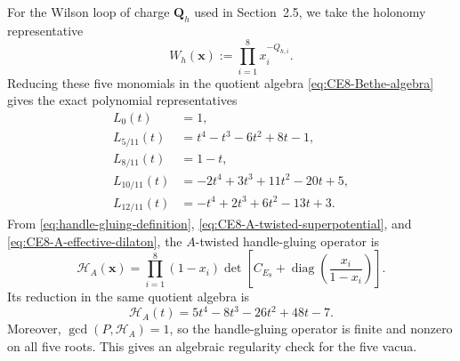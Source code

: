 \documentclass[11pt,a4paper]{article}
\numberwithin{equation}{section}
\begin{document}
For the Wilson loop of charge $\boldsymbol Q_h$ used in Section~2.5, we take the holonomy representative
\begin{equation}
  W_h(\boldsymbol x)
  :=\prod_{i=1}^{8}x_i^{-Q_{h,i}}.
  \label{eq:CE8-Wilson-holonomy}
\end{equation}
Reducing these five monomials in the quotient algebra \eqref{eq:CE8-Bethe-algebra} gives the exact polynomial representatives
\begin{equation}
\begin{aligned}
  L_0(t)&=1,\\
  L_{5/11}(t)&=t^4-t^3-6t^2+8t-1,\\
  L_{8/11}(t)&=1-t,\\
  L_{10/11}(t)&=-2t^4+3t^3+11t^2-20t+5,\\
  L_{12/11}(t)&=-t^4+2t^3+6t^2-13t+3.
\end{aligned}
  \label{eq:CE8-Wilson-polynomials}
\end{equation}
From \eqref{eq:handle-gluing-definition}, \eqref{eq:CE8-A-twisted-superpotential}, and \eqref{eq:CE8-A-effective-dilaton}, the $A$-twisted handle-gluing operator is
\begin{equation}
  \mathcal H_A(\boldsymbol x)
  =
  \prod_{i=1}^{8}(1-x_i)
  \det\!\left[
  C_{E_8}
  +\operatorname{diag}\!\left(\frac{x_i}{1-x_i}\right)
  \right].
  \label{eq:CE8-A-handle-gluing}
\end{equation}
Its reduction in the same quotient algebra is
\begin{equation}
  \mathcal H_A(t)
  =5t^4-8t^3-26t^2+48t-7.
  \label{eq:CE8-handle-polynomial}
\end{equation}
Moreover, $\gcd(P,\mathcal H_A)=1$, so the handle-gluing operator is finite and nonzero on all five roots.  This gives an algebraic regularity check for the five vacua.
\end{document}
